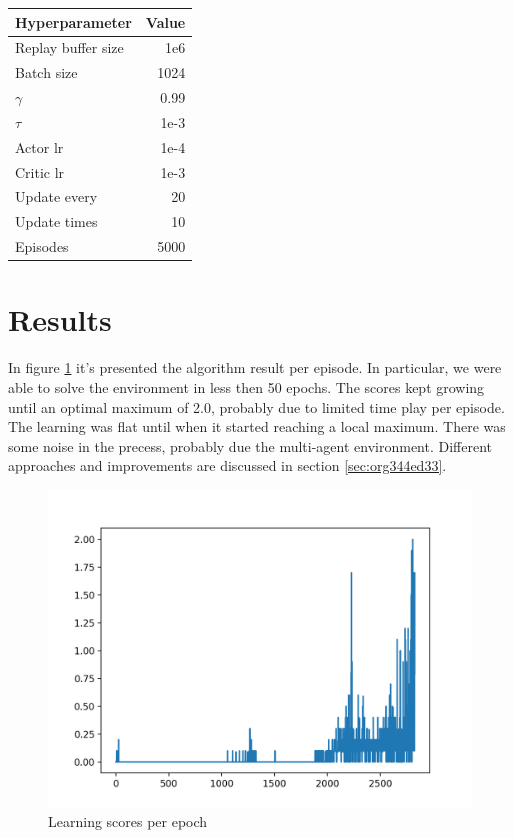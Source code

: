 \documentclass[11pt]{article}
\begin{document}
\begin{center}
\begin{tabular}{lr}
Hyperparameter & Value\\
\hline
Replay buffer size & 1e6\\
Batch size & 1024\\
\(\gamma\) & 0.99\\
\(\tau\) & 1e-3\\
Actor lr & 1e-4\\
Critic lr & 1e-3\\
Update every & 20\\
Update times & 10\\
Episodes & 5000\\
\hline
\end{tabular}
\end{center}


\section{Results}
\label{sec:org679590f}
In figure \ref{fig:orgd6d4ae0} it's presented the algorithm result per episode. In
particular, we were able to solve the environment in less then 50 epochs. The
scores kept growing until an optimal maximum of 2.0, probably due to limited
time play per episode. The learning was flat until when it started reaching a
local maximum. There was some noise in the precess, probably due the multi-agent
environment. Different approaches and improvements are discussed in section
\ref{sec:org344ed33}.

\begin{figure}[htbp]
\centering
\includegraphics[width=.9\linewidth]{../contents/solved.png}
\caption{\label{fig:orgd6d4ae0}Learning scores per epoch}
\end{figure}
\end{document}
